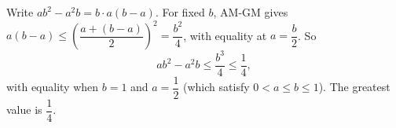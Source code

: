 Write $ab^2-a^2b=b\cdot a(b-a)$. For fixed $b$, AM-GM gives $a(b-a)\le\left(\dfrac{a+(b-a)}{2}\right)^2=\dfrac{b^2}{4}$, with equality at $a=\dfrac {b}{2}$. So
\[
ab^2-a^2b\le\dfrac{b^3}{4}\le\dfrac{1}{4} ,
\]
with equality when $b=1$ and $a=\dfrac{1}{2}$ (which satisfy $0<a\le b\le1$). The greatest value is $\boxed{\dfrac{1}{4}}$.

